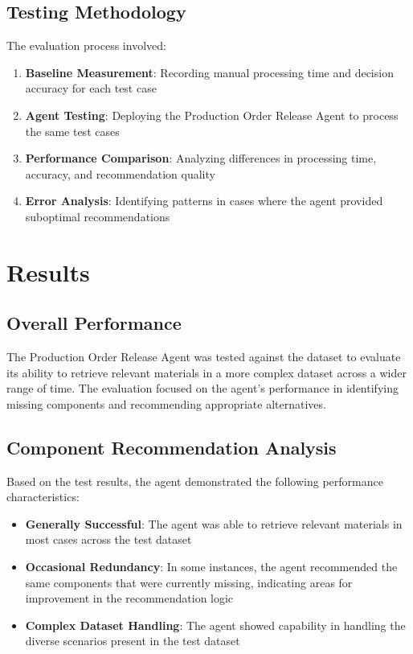 \subsection{Testing Methodology}

The evaluation process involved:

\begin{enumerate}
    \item \textbf{Baseline Measurement}: Recording manual processing time and decision accuracy for each test case
    \item \textbf{Agent Testing}: Deploying the Production Order Release Agent to process the same test cases
    \item \textbf{Performance Comparison}: Analyzing differences in processing time, accuracy, and recommendation quality
    \item \textbf{Error Analysis}: Identifying patterns in cases where the agent provided suboptimal recommendations
\end{enumerate}

\section{Results}

\subsection{Overall Performance}

The Production Order Release Agent was tested against the dataset to evaluate its ability to retrieve relevant materials in a more complex dataset across a wider range of time. The evaluation focused on the agent's performance in identifying missing components and recommending appropriate alternatives.

\subsection{Component Recommendation Analysis}

Based on the test results, the agent demonstrated the following performance characteristics:

\begin{itemize}
    \item \textbf{Generally Successful}: The agent was able to retrieve relevant materials in most cases across the test dataset
    \item \textbf{Occasional Redundancy}: In some instances, the agent recommended the same components that were currently missing, indicating areas for improvement in the recommendation logic
    \item \textbf{Complex Dataset Handling}: The agent showed capability in handling the diverse scenarios present in the test dataset
\end{itemize}

